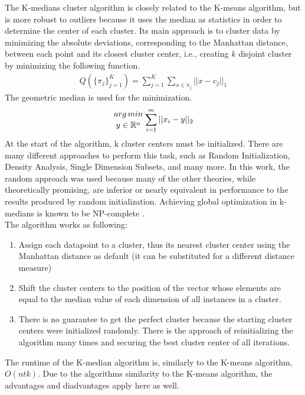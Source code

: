 The K-medians cluster algorithm is closely related to the K-means algorithm, but is more robust to outliers because it uses the median as statistics in order to determine the center of each cluster. Its main approach is to cluster data by minimizing the absolute deviations, corresponding to the Manhattan distance, between each point and its closest cluster center, i.e., creating $k$ disjoint cluster by minimizing the following function. \cite{kmed}
\begin{align}
    Q(\{\pi_j\}^K_{j=1}) = \sum_{j=1}^{K}\sum_{x \in \pi_j}||x-c_j||_1
\end{align}
The geometric median is used for the minimization.
\begin{align}
    {{arg\, min}\atop{y\in\mathbb{R}^n}} \sum_{i=1}^m ||x_i-y||_2
\end{align}
At the start of the algorithm, k cluster centers must be initialized. There are many different approaches to perform this task, such as Random Initialization, Density Analysis, Single Dimension Subsets, and many more. In this work, the random approach was used because many of the other theories, while theoretically promising, are inferior or nearly equivalent in performance to the results produced by random initialization. \cite{kmed} Achieving global optimization in k-medians is known to be NP-complete \cite{kmed_time}.\\ 
The algorithm works as following:\cite{algo_kmed}
\begin{enumerate}
    \item Assign each datapoint to a cluster, thus its nearest cluster center using the Manhattan distance as default (it can be substituted for a different distance measure) 
    \item Shift the cluster centers to the position of the vector whose elements are equal to the median value of each dimension of all instances in a cluster.
    \item There is no guarantee to get the perfect cluster because the starting cluster centers were initialized randomly. There is the approach of reinitializing the algorithm many times and securing the best cluster center of all iterations.
\end{enumerate}
The runtime of the K-median algorithm is, similarly to the K-means algorithm, $O(ntk)$. Due to the algorithms similarity to the K-means algorithm, the advantages and diadvantages apply here as well.\\
